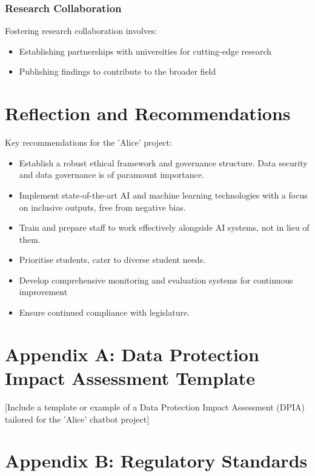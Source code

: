 \documentclass[14pt,a4paper]{article}
\begin{document}
\begin{multicols}{2}
\subsubsection*{Research Collaboration}
Fostering research collaboration \textit{\parencite[pp. 50-100]{Dillenbourg2023}} involves:
\begin{itemize}
    \item Establishing partnerships with universities for cutting-edge research
    \item Publishing findings to contribute to the broader field
\end{itemize}

\section{Reflection and Recommendations}

Key recommendations for the 'Alice' project:
\begin{itemize}
  \item Establish a robust ethical framework and governance structure. Data security and data governance is of paramount importance.
  \item Implement state-of-the-art AI and machine learning technologies with a focus on inclusive outputs, free from negative bias.
  \item Train and prepare staff to work effectively alongside AI systems, not in lieu of them.
  \item Prioritise students, cater to diverse student needs.
  \item Develop comprehensive monitoring and evaluation systems for continuous improvement
  \item Ensure continued compliance with legislature.
\end{itemize}



\end{multicols}

\newpage
\appendix
\section{Appendix A: Data Protection Impact Assessment Template}\label{appendix:a}
[Include a template or example of a Data Protection Impact Assessment (DPIA) tailored for the 'Alice' chatbot project]

\newpage

\section{Appendix B: Regulatory Standards}\label{appendix:b}
\end{document}
